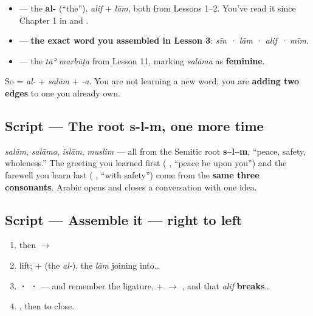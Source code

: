 \begin{itemize}
\raggedright
  \item \textbf{} — the \textbf{al-} (\textquotedblleft{}the\textquotedblright{}), \emph{alif} + \emph{lām}, both from Lessons 1–2. You've read it since Chapter 1 in \textbf{} and \textbf{} .
  \item \textbf{} — \textbf{the exact word you assembled in Lesson 3}: \emph{sīn · lām · alif · mīm}.
  \item \textbf{} — the \emph{tāʾ marbūṭa} from Lesson 11, marking \emph{salāma} as \textbf{feminine}.
\end{itemize}

So \textbf{} = \emph{al-} + \emph{salām} + \emph{-a}. You are not learning a new word; you are \textbf{adding two edges} to one you already own.

\subsection*{Script — The root s-l-m, one more time}
\emph{salām}, \emph{salāma}, \emph{islām}, \emph{muslim} — all from the Semitic root \textbf{s–l–m}, \textquotedblleft{}peace, safety, wholeness.\textquotedblright{} The greeting you learned first (\textbf{ }, \textquotedblleft{}peace be upon you\textquotedblright{}) and the farewell you learn last (\textbf{ }, \textquotedblleft{}with safety\textquotedblright{}) come from the \textbf{same three consonants}. Arabic opens and closes a conversation with one idea.

\subsection*{Script — Assemble it — right to left}
\begin{enumerate}
\raggedright
  \item \textbf{} then \textbf{} $\to$ \textbf{}
  \item lift; \textbf{} + \textbf{} (the \emph{al-}), the \emph{lām} joining into…
  \item \textbf{ ·  · } — and remember the ligature, \textbf{} + \textbf{} $\to$ \textbf{}, and that \emph{alif} \textbf{breaks}…
  \item \textbf{}, then \textbf{} to close.
\end{enumerate}

